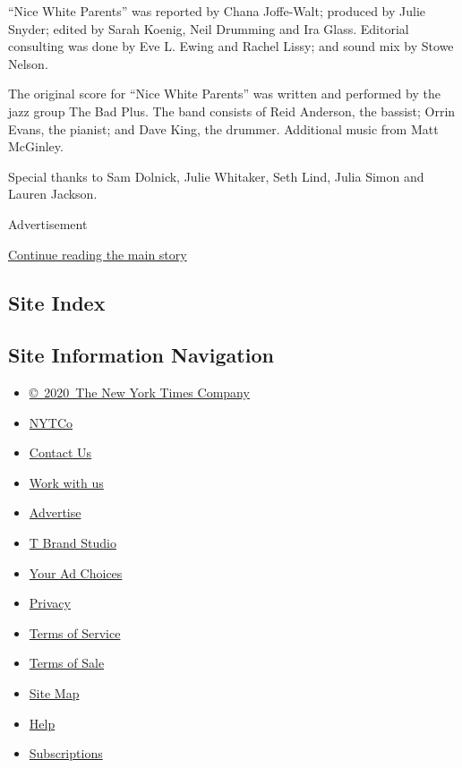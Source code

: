 ``Nice White Parents'' was reported by Chana Joffe-Walt; produced by
Julie Snyder; edited by Sarah Koenig, Neil Drumming and Ira Glass.
Editorial consulting was done by Eve L. Ewing and Rachel Lissy; and
sound mix by Stowe Nelson.

The original score for ``Nice White Parents'' was written and performed
by the jazz group The Bad Plus. The band consists of Reid Anderson, the
bassist; Orrin Evans, the pianist; and Dave King, the drummer.
Additional music from Matt McGinley.

Special thanks to Sam Dolnick, Julie Whitaker, Seth Lind, Julia Simon
and Lauren Jackson.

Advertisement

\protect\hyperlink{after-bottom}{Continue reading the main story}

\hypertarget{site-index}{%
\subsection{Site Index}\label{site-index}}

\hypertarget{site-information-navigation}{%
\subsection{Site Information
Navigation}\label{site-information-navigation}}

\begin{itemize}
\tightlist
\item
  \href{https://help.nytimes3xbfgragh.onion/hc/en-us/articles/115014792127-Copyright-notice}{©~2020~The
  New York Times Company}
\end{itemize}

\begin{itemize}
\tightlist
\item
  \href{https://www.nytco.com/}{NYTCo}
\item
  \href{https://help.nytimes3xbfgragh.onion/hc/en-us/articles/115015385887-Contact-Us}{Contact
  Us}
\item
  \href{https://www.nytco.com/careers/}{Work with us}
\item
  \href{https://nytmediakit.com/}{Advertise}
\item
  \href{http://www.tbrandstudio.com/}{T Brand Studio}
\item
  \href{https://www.nytimes3xbfgragh.onion/privacy/cookie-policy\#how-do-i-manage-trackers}{Your
  Ad Choices}
\item
  \href{https://www.nytimes3xbfgragh.onion/privacy}{Privacy}
\item
  \href{https://help.nytimes3xbfgragh.onion/hc/en-us/articles/115014893428-Terms-of-service}{Terms
  of Service}
\item
  \href{https://help.nytimes3xbfgragh.onion/hc/en-us/articles/115014893968-Terms-of-sale}{Terms
  of Sale}
\item
  \href{https://spiderbites.nytimes3xbfgragh.onion}{Site Map}
\item
  \href{https://help.nytimes3xbfgragh.onion/hc/en-us}{Help}
\item
  \href{https://www.nytimes3xbfgragh.onion/subscription?campaignId=37WXW}{Subscriptions}
\end{itemize}
